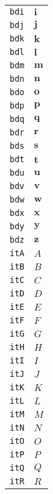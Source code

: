 \begin{longtable}{ll}
\texttt{bdi}&${}{\textbf{i}}{}$\\
\texttt{bdj}&${}{\textbf{j}}{}$\\
\texttt{bdk}&${}{\textbf{k}}{}$\\
\texttt{bdl}&${}{\textbf{l}}{}$\\
\texttt{bdm}&${}{\textbf{m}}{}$\\
\texttt{bdn}&${}{\textbf{n}}{}$\\
\texttt{bdo}&${}{\textbf{o}}{}$\\
\texttt{bdp}&${}{\textbf{p}}{}$\\
\texttt{bdq}&${}{\textbf{q}}{}$\\
\texttt{bdr}&${}{\textbf{r}}{}$\\
\texttt{bds}&${}{\textbf{s}}{}$\\
\texttt{bdt}&${}{\textbf{t}}{}$\\
\texttt{bdu}&${}{\textbf{u}}{}$\\
\texttt{bdv}&${}{\textbf{v}}{}$\\
\texttt{bdw}&${}{\textbf{w}}{}$\\
\texttt{bdx}&${}{\textbf{x}}{}$\\
\texttt{bdy}&${}{\textbf{y}}{}$\\
\texttt{bdz}&${}{\textbf{z}}{}$\\
\texttt{itA}&${}{\textit{A}}{}$\\
\texttt{itB}&${}{\textit{B}}{}$\\
\texttt{itC}&${}{\textit{C}}{}$\\
\texttt{itD}&${}{\textit{D}}{}$\\
\texttt{itE}&${}{\textit{E}}{}$\\
\texttt{itF}&${}{\textit{F}}{}$\\
\texttt{itG}&${}{\textit{G}}{}$\\
\texttt{itH}&${}{\textit{H}}{}$\\
\texttt{itI}&${}{\textit{I}}{}$\\
\texttt{itJ}&${}{\textit{J}}{}$\\
\texttt{itK}&${}{\textit{K}}{}$\\
\texttt{itL}&${}{\textit{L}}{}$\\
\texttt{itM}&${}{\textit{M}}{}$\\
\texttt{itN}&${}{\textit{N}}{}$\\
\texttt{itO}&${}{\textit{O}}{}$\\
\texttt{itP}&${}{\textit{P}}{}$\\
\texttt{itQ}&${}{\textit{Q}}{}$\\
\texttt{itR}&${}{\textit{R}}{}$\\

\end{longtable}
